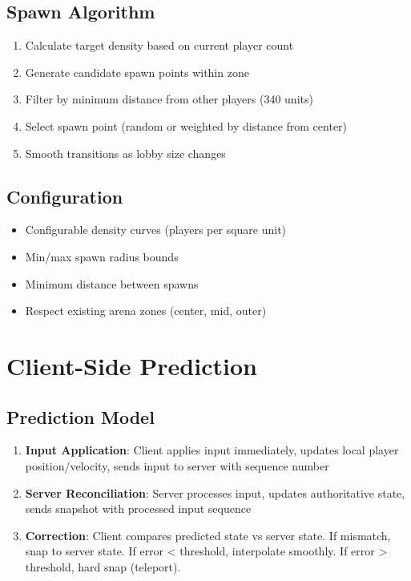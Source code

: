 \documentclass[11pt]{article}
\begin{document}
\subsection{Spawn Algorithm}

\begin{enumerate}
  \item Calculate target density based on current player count
  \item Generate candidate spawn points within zone
  \item Filter by minimum distance from other players (340 units)
  \item Select spawn point (random or weighted by distance from center)
  \item Smooth transitions as lobby size changes
\end{enumerate}

\subsection{Configuration}

\begin{itemize}
  \item Configurable density curves (players per square unit)
  \item Min/max spawn radius bounds
  \item Minimum distance between spawns
  \item Respect existing arena zones (center, mid, outer)
\end{itemize}

\section{Client-Side Prediction}

\subsection{Prediction Model}

\begin{enumerate}
  \item \textbf{Input Application}: Client applies input immediately, updates local player position/velocity, sends input to server with sequence number
  \item \textbf{Server Reconciliation}: Server processes input, updates authoritative state, sends snapshot with processed input sequence
  \item \textbf{Correction}: Client compares predicted state vs server state. If mismatch, snap to server state. If error < threshold, interpolate smoothly. If error > threshold, hard snap (teleport).
\end{enumerate}
\end{document}
